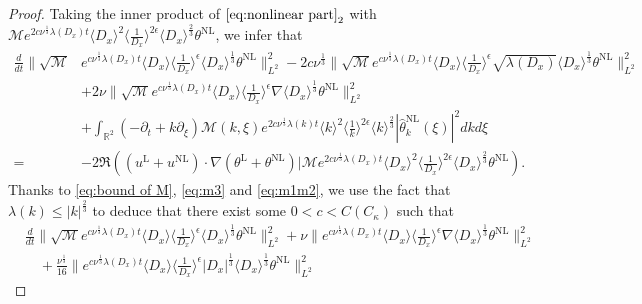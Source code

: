 \documentclass[reqno, 12pt]{amsart} %
\theoremstyle{plain} %
\theoremstyle{definition}
\theoremstyle{remark}
\numberwithin{equation}{section} %
\begin{document}
	
	\begin{proof}
		Taking the inner product of $\eqref{eq:nonlinear part}_2$ with $\mathcal{M} e^{2 c \nu^{\frac{1}{3}} \lambda\left(D_x\right) t}\langle D_x\rangle^2\langle\frac{1}{D_x}\rangle^{2 \epsilon} \langle D_x \rangle^\frac23  \theta^{\mathrm{NL}}$, we infer that
		\small{	$$
			\begin{aligned}
				\frac{d}{d t} \| \sqrt{\mathcal{M}} & e^{c \nu^{\frac{1}{3}} \lambda\left(D_x\right) t}\langle D_x\rangle \langle\frac{1}{D_x}\rangle^\epsilon \langle D_x \rangle^\frac13  \theta^{\mathrm{NL}}\|_{L^2}^2-2 c \nu^{\frac{1}{3}}\| \sqrt{\mathcal{M}} e^{c \nu^{\frac{1}{3}} \lambda\left(D_x\right) t}\langle D_x\rangle\langle\frac{1}{D_x}\rangle^\epsilon \sqrt{\lambda\left(D_x\right)} \langle D_x \rangle^\frac13  \theta^{\mathrm{NL}} \|_{L^2}^2 \\
				& +2 \nu\|\sqrt{\mathcal{M}} e^{c \nu^{\frac{1}{3}} \lambda\left(D_x\right) t}\langle D_x\rangle\langle\frac{1}{D_x}\rangle^\epsilon \nabla \langle D_x \rangle^\frac13  \theta^{\mathrm{NL}}\|_{L^2}^2 \\
				& +\int_{\mathbb{R}^2}\left(-\partial_t+k \partial_{\xi}\right) \mathcal{M}(k, \xi) e^{2 c \nu^{\frac{1}{3}} \lambda(k) t}\langle k\rangle^2\langle\frac{1}{k}\rangle^{2 \epsilon} \langle k \rangle^\frac23 \left|\hat{\theta}_k^{\mathrm{NL}}(\xi)\right|^2 d k d \xi \\
				= & -2 \Re\left((u^{\mathrm{L}}+u^{\mathrm{NL}}) \cdot \nabla(\theta^{\mathrm{L}}+\theta^{\mathrm{NL}}) \big| \mathcal{M} e^{2 c \nu^{\frac{1}{3}} \lambda\left(D_x\right) t}\langle D_x\rangle^2\langle\frac{1}{D_x}\rangle^{2 \epsilon}  \langle D_x \rangle^\frac23  \theta^{\mathrm{NL}}\right).
			\end{aligned}
			$$}
		Thanks to \eqref{eq:bound of M}, \eqref{eq:m3} and \eqref{eq:m1m2}, we use the fact that $\lambda(k) \leq|k|^{\frac{2}{3}}$ to deduce that there exist some $0<c<C(C_\kappa)$ such that
		$$
		\begin{aligned}
			& \frac{d}{d t}\|\sqrt{\mathcal{M}} e^{c \nu^{\frac{1}{3}} \lambda\left(D_x\right) t}\langle D_x\rangle\langle\frac{1}{D_x}\rangle^\epsilon \langle D_x \rangle^\frac13  \theta^{\mathrm{NL}}\|_{L^2}^2+\nu\|e^{c \nu^{\frac{1}{3}} \lambda\left(D_x\right) t}\langle D_x\rangle\langle\frac{1}{D_x}\rangle^\epsilon \nabla \langle D_x \rangle^\frac13  \theta^{\mathrm{NL}}\|_{L^2}^2 \\
			& \quad+\frac{\nu^{\frac{1}{3}}}{16}\|e^{c \nu^{\frac{1}{3}} \lambda\left(D_x\right) t}\langle D_x\rangle\langle\frac{1}{D_x}\rangle^\epsilon\left|D_x\right|^{\frac{1}{3}}  \langle D_x \rangle ^\frac13 \theta^{\mathrm{NL}}\|_{L^2}^2  

\end{aligned}$$
\end{proof}
\end{document}
